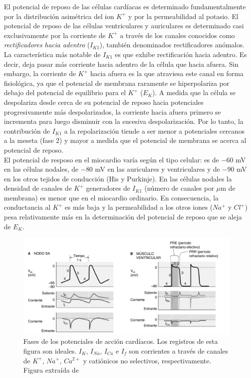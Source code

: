 \begin{itemize}
  El potencial de reposo de las células cardíacas es determinado fundamentalmente por la distribución asimétrica
  del ion $K^+$ y por la permeabilidad al potasio. El potencial de reposo de las células ventriculares y auriculares
  es determinado casi exclusivamente por la corriente de $K^+$ a través de los canales conocidos como
  \textit{rectificadores hacia adentro} ($I_{K1}$), también denominados rectificadores anómalos.
  La característica más notable de $I_{K1}$ es que exhibe rectificación hacia adentro. Es decir, deja pasar más
  corriente hacia adentro de la célula que hacia afuera. Sin embargo, la corriente de $K^+$ hacia afuera es la que
  atraviesa este canal en forma fisiológica, ya que el potencial de membrana raramente se hiperpolariza por debajo
  del potencial de equilibrio para el $K^+$ ($E_K$). A medida que la célula se despolariza desde cerca de su potencial
  de reposo hacia potenciales progresivamente más despolarizados, la corriente hacia afuera primero se incrementa
  para luego disminuir con la sucesiva despolarización. Por lo tanto, la contribución de $I_{K1}$ a la repolarización
  tiende a ser menor a potenciales cercanos a la meseta (fase 2) y mayor a medida que el potencial de membrana
  se acerca al potencial de reposo. \\El potencial de resposo en el miocardio varía según el tipo celular:
  es de $-60$ mV en las células nodales, de $-80$ mV en las auriculares y ventriculares y de $-90$ mV en los otros
  tejidos de conducción (His y Purkinje). En las células nodales la densidad de canales de $K^+$ generadores
  de $I_{K1}$ (número de canales por $\mu$m de membrana) es menor que en el miocardio ordinario. En consecuencia,
  la conductancia al $K^+$ es más baja y la permeabilidad a los otros iones ($Na^+$ y $Cl^+$) pesa relativamente
  más en la determinación del potencial de reposo que se aleja de $E_K$.
\end{itemize}

\begin{figure}[H]
  \centering
  \includegraphics[scale=0.45]{chapters/chapter-02/images/action_potential_phases.png}
  \caption[Fases de los potenciales de acción cardíacos.]{Fases de los potenciales de acción cardíacos. Los
  registros de esta figura son ideales. $I_K$, $I_{Na}$, $I_{Ca}$ e $I_f$ son corrientes a través de canales
  de $K^+$, $Na^+$, $Ca^{2+}$ y catiónicos no selectivos, respectivamente. Figura extraída de \cite{bk:boron3ed}}
  \label{fig:action_potential_phases}
\end{figure}

